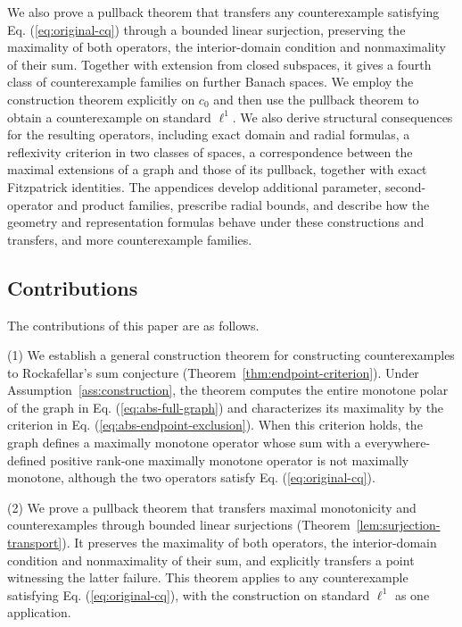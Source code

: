 \documentclass[11pt]{article}
\theoremstyle{definition}
\theoremstyle{remark}
\begin{document}
We also prove a pullback theorem that transfers any counterexample satisfying Eq. (\ref{eq:original-cq}) through a bounded linear surjection, preserving the maximality of both operators, the interior-domain condition and nonmaximality of their sum. Together with extension from closed subspaces, it gives a fourth class of counterexample families on further Banach spaces. We employ the construction theorem explicitly on $c_0$ and then use the pullback theorem to obtain a counterexample on standard $\ell^1$.  We also derive structural consequences for the resulting operators, including exact domain and radial formulas, a reflexivity criterion in two classes of spaces, a correspondence between the maximal extensions of a graph and those of its pullback, together with exact Fitzpatrick identities. The appendices develop additional parameter, second-operator and product families, prescribe radial bounds, and describe how the geometry and representation formulas behave under these constructions and transfers, and more counterexample families. 





\subsection{Contributions}
The contributions of this paper are as follows. 

(1) We establish a general construction theorem for constructing counterexamples to Rockafellar's sum conjecture (Theorem~\ref{thm:endpoint-criterion}). Under Assumption~\ref{ass:construction}, the theorem computes the entire monotone polar of the graph in Eq. (\ref{eq:abs-full-graph}) and characterizes its maximality by the criterion in Eq. (\ref{eq:abs-endpoint-exclusion}). When this criterion holds, the graph defines a maximally monotone operator whose sum with a everywhere-defined positive rank-one maximally monotone operator is not maximally monotone, although the two operators satisfy Eq. (\ref{eq:original-cq}). 

(2) We prove a pullback theorem that transfers maximal monotonicity and counterexamples through bounded linear surjections (Theorem~\ref{lem:surjection-transport}). It preserves the maximality of both operators, the interior-domain condition and nonmaximality of their sum, and explicitly transfers a point witnessing the latter failure. This theorem applies to any counterexample satisfying Eq. (\ref{eq:original-cq}), with the construction on standard $\ell^1$ as one application.
\end{document}
